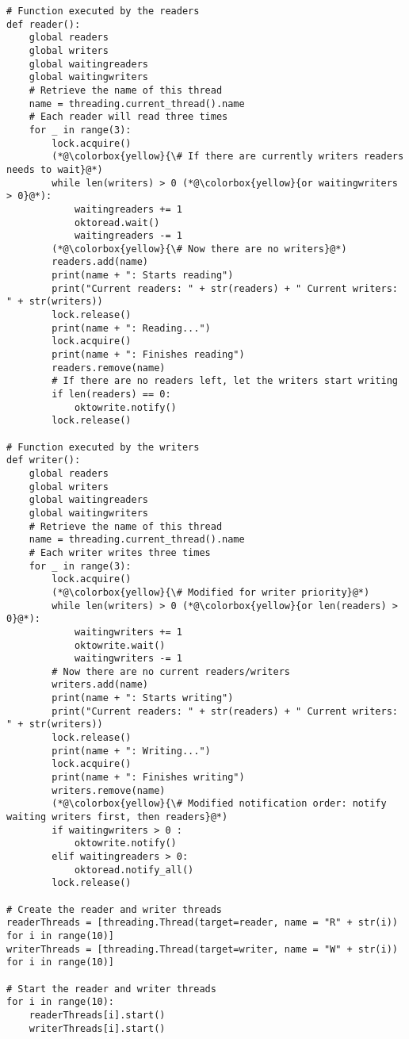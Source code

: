 \documentclass{article}
\begin{document}
\begin{enumerate}[label=\textbf{\makebox[1cm][l]{\Huge\text{(\stylishfont\alph*)}}}, leftmargin=!, labelindent=0pt]
\begin{lstlisting}
# Function executed by the readers
def reader():
    global readers
    global writers
    global waitingreaders
    global waitingwriters
    # Retrieve the name of this thread
    name = threading.current_thread().name
    # Each reader will read three times
    for _ in range(3):
        lock.acquire()
        (*@\colorbox{yellow}{\# If there are currently writers readers needs to wait}@*)
        while len(writers) > 0 (*@\colorbox{yellow}{or waitingwriters > 0}@*):
            waitingreaders += 1
            oktoread.wait()
            waitingreaders -= 1
        (*@\colorbox{yellow}{\# Now there are no writers}@*)
        readers.add(name)
        print(name + ": Starts reading")
        print("Current readers: " + str(readers) + " Current writers: " + str(writers))
        lock.release()
        print(name + ": Reading...")
        lock.acquire()
        print(name + ": Finishes reading")
        readers.remove(name)
        # If there are no readers left, let the writers start writing
        if len(readers) == 0:
            oktowrite.notify()
        lock.release()

# Function executed by the writers
def writer():
    global readers
    global writers
    global waitingreaders
    global waitingwriters
    # Retrieve the name of this thread
    name = threading.current_thread().name
    # Each writer writes three times
    for _ in range(3):
        lock.acquire()
        (*@\colorbox{yellow}{\# Modified for writer priority}@*)
        while len(writers) > 0 (*@\colorbox{yellow}{or len(readers) > 0}@*):
            waitingwriters += 1
            oktowrite.wait()
            waitingwriters -= 1
        # Now there are no current readers/writers
        writers.add(name)
        print(name + ": Starts writing")
        print("Current readers: " + str(readers) + " Current writers: " + str(writers))
        lock.release()
        print(name + ": Writing...")    
        lock.acquire()
        print(name + ": Finishes writing")
        writers.remove(name)
        (*@\colorbox{yellow}{\# Modified notification order: notify waiting writers first, then readers}@*)
        if waitingwriters > 0 :
            oktowrite.notify()
        elif waitingreaders > 0:
            oktoread.notify_all()
        lock.release()

# Create the reader and writer threads
readerThreads = [threading.Thread(target=reader, name = "R" + str(i)) for i in range(10)]
writerThreads = [threading.Thread(target=writer, name = "W" + str(i)) for i in range(10)]

# Start the reader and writer threads
for i in range(10):
    readerThreads[i].start()
    writerThreads[i].start()
        \end{lstlisting}
    

\end{enumerate}
\end{document}
